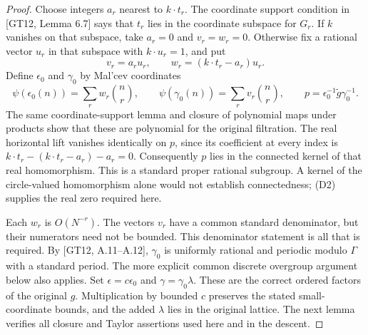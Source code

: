 \documentclass[11pt]{article}
\begin{document}
\begin{proof}
Choose integers $a_r$ nearest to $k\cdot t_r$.
The coordinate support condition in [GT12, Lemma 6.7] says that $t_r$ lies
in the coordinate subspace for $G_r$. If $k$ vanishes on that subspace,
take $a_r=0$ and $v_r=w_r=0$. Otherwise fix a rational vector $u_r$ in
that subspace with $k\cdot u_r=1$, and put
\[
 v_r=a_ru_r,\qquad w_r=(k\cdot t_r-a_r)u_r.
\]
Define $\epsilon_0$ and $\gamma_0$ by Mal'cev coordinates
\[
 \psi(\epsilon_0(n))=\sum_r w_r\binom n r,
 \qquad \psi(\gamma_0(n))=\sum_r v_r\binom n r,
 \qquad p=\epsilon_0^{-1}\widetilde g\gamma_0^{-1}.             \tag{D2}
\]
The same coordinate-support lemma and closure of polynomial maps under
products show that these are polynomial for the original filtration.
The real horizontal lift vanishes identically on $p$, since its coefficient
at every index is $k\cdot t_r-(k\cdot t_r-a_r)-a_r=0$.
Consequently $p$ lies in the connected kernel of that real homomorphism.
This is a standard proper rational subgroup. A kernel of the circle-valued
homomorphism alone would not establish connectedness; (D2) supplies the real
zero required here.

Each $w_r$ is $O(N^{-r})$. The vectors $v_r$ have a common standard
denominator, but their numerators need not be bounded. This denominator
statement is all that is required. By [GT12, A.11--A.12], $\gamma_0$ is
uniformly rational and periodic modulo $\Gamma$ with a standard period.
The more explicit common discrete overgroup argument below also applies.
Set $\epsilon=c\epsilon_0$ and $\gamma=\gamma_0\lambda$.
These are the correct ordered factors of the original $g$.
Multiplication by bounded $c$ preserves the stated small-coordinate bounds,
and the added $\lambda$ lies in the original lattice. The next lemma verifies
all closure and Taylor assertions used here and in the descent.
\end{proof}
\end{document}
